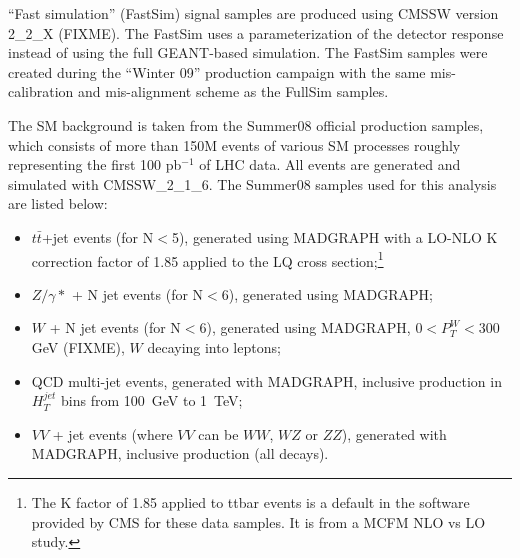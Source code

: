 ``Fast simulation'' (FastSim) signal samples are produced using CMSSW version 2\_2\_X (FIXME). The FastSim uses a parameterization
of the detector response instead of using the full GEANT-based simulation.
The FastSim samples were created during the ``Winter 09'' production campaign with the same mis-calibration 
and mis-alignment scheme as the FullSim samples.

The SM background is taken from the Summer08 official production samples,
which consists of more than 150M events of various SM processes roughly representing the first 100 pb$^{-1}$ of LHC data.
All events are generated and simulated with CMSSW\_2\_1\_6. 
The Summer08 samples used for this analysis are listed below:
\begin{itemize}
%
\item $t\bar{t}$+jet events (for N$<$5), generated using MADGRAPH \cite{Mangano:2002ea} with a 
LO-NLO K correction factor of 1.85 applied 
to the LQ cross section;\footnote{The K factor of 1.85 applied to ttbar events is a default in the software provided by CMS for 
 these data samples.  It is from a MCFM NLO vs LO study.}
%
\item $Z/\gamma*$ + N jet events (for N$<$6), generated using MADGRAPH;  
%
\item $W$ + N jet events (for N$<$6), generated using MADGRAPH, $ 0 < P_{T}^{W} < 300 $ GeV (FIXME), $W$ decaying into leptons;  
%
\item QCD multi-jet events, generated with MADGRAPH, inclusive production in $H_{T}^{jet}$ bins from 100~GeV to 1~TeV;  
%
%
\item $VV$ + jet events (where $VV$ can be $WW$, $WZ$ or $ZZ$), generated with MADGRAPH, inclusive production (all decays).
\end{itemize} 


